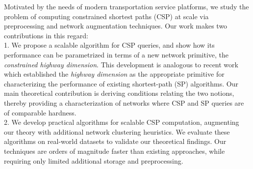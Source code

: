 Motivated by the needs of modern transportation service platforms, we study the problem of computing constrained shortest paths (CSP) at scale via preprocessing and network augmentation techniques.
Our work makes two contributions in this regard:\\
1. We propose a scalable algorithm for CSP queries, and show how its performance can be parametrized in terms of a new network primitive, the \emph{constrained highway dimension}. 
This development is analogous to recent work which established the \emph{highway dimension} as the appropriate primitive for characterizing the performance of existing shortest-path (SP) algorithms. 
Our main theoretical contribution is deriving conditions relating the two notions, thereby providing a characterization of networks where CSP and SP queries are of comparable hardness.\\
2. We develop practical algorithms for scalable CSP computation, augmenting our theory with additional network clustering heuristics. 
We evaluate these algorithms on real-world datasets to validate our theoretical findings. 
Our techniques are orders of magnitude faster than existing approaches, while requiring only limited additional storage and preprocessing.